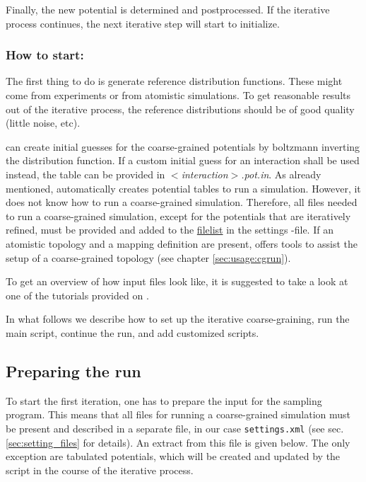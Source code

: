 Finally, the new potential is determined and postprocessed. If the iterative process continues, the next iterative step will start to initialize.

\subsubsection*{How to start:}

The first thing to do is generate reference distribution functions. These might come from experiments or from atomistic simulations. To get reasonable results out of the iterative process, the reference distributions should be of good quality (little noise, etc).

\votca can create initial guesses for the coarse-grained potentials by boltzmann inverting the distribution function. If a custom initial guess for an interaction shall be used instead, the table can be provided in \textit{$<$interaction$>$.pot.in}. As already mentioned, \votca automatically creates potential tables to run a simulation. However, it does not know how to run a coarse-grained simulation. Therefore, all files needed to run a coarse-grained simulation, except for the potentials that are iteratively refined, must be provided and added to the \hyperlink{\cgref{inverse.filelist}}{filelist} in the settings \xml-file. If an atomistic topology and a mapping definition are present, \votca offers tools to assist the setup of a  coarse-grained topology (see chapter \ref{sec:usage:cgrun}).

To get an overview of how input files look like, it is suggested to take a look at one of the tutorials provided on \votcaweb.

In what follows we describe how to set up the iterative coarse-graining, run the main script, continue the run, and add customized scripts.

\subsection{Preparing the run}
\label{sec:preparing_the_run}
To start the first iteration, one has to prepare the input for the sampling program. This means that all files for running a coarse-grained simulation must be present and described in a separate \xml file, in our case \texttt{settings.xml} (see sec. \ref{sec:setting_files} for details). An extract from this file is given below. The only exception are tabulated potentials, which will be created and updated by the script in the course of the iterative process.

